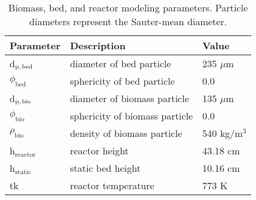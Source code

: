 \begin{table}[H]
    \centering
    \caption{Biomass, bed, and reactor modeling parameters. Particle diameters represent the Sauter-mean diameter.}
    \begin{tabular}{lll}
        \hline
        Parameter & Description & Value \\
        \hline
        d$_\textrm{p,\,bed}$    & diameter of bed particle          & 235 $\mu$m \\
        $\phi_\textrm{bed}$     & sphericity of bed particle        & 0.0 \\
        d$_\textrm{p,\,bio}$    & diameter of biomass particle      & 135 $\mu$m \\
        $\phi_\textrm{bio}$     & sphericity of biomass particle    & 0.0 \\
        $\rho_\textrm{bio}$     & density of biomass particle       & 540 kg/m$^3$ \\
        h$_\textrm{reactor}$    & reactor height                    & 43.18 cm \\
        h$_\textrm{static}$     & static bed height                 & 10.16 cm\\
        tk                      & reactor temperature               & 773 K \\
        \hline
    \end{tabular}
    \label{tab:params}
\end{table}
